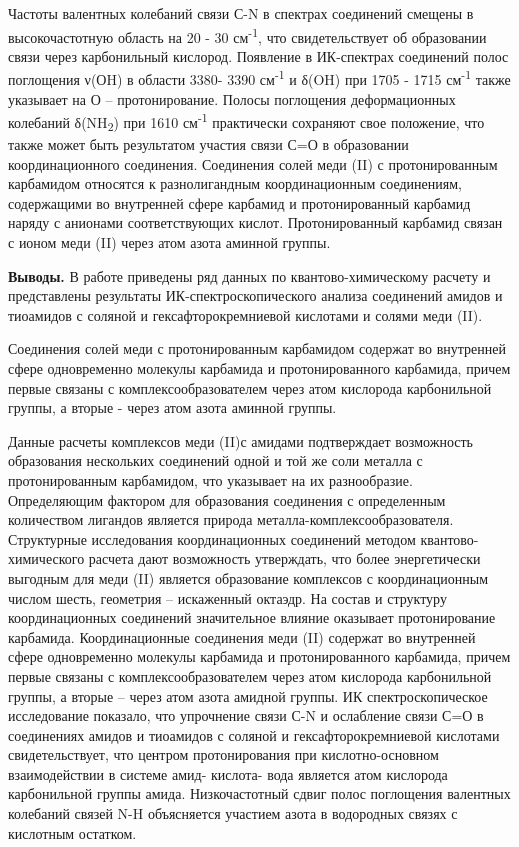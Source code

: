 Частоты валентных колебаний связи С-N в спектрах соединений смещены в
высокочастотную область на 20 - 30 см\textsuperscript{-1}, что
свидетельствует об образовании связи через карбонильный кислород.
Появление в ИК-спектрах соединений полос поглощения ν(ОH) в области
3380- 3390 см\textsuperscript{-1} и δ(OH) при 1705 - 1715
см\textsuperscript{-1} также указывает на О -- протонирование. Полосы
поглощения деформационных колебаний δ(NH\textsubscript{2}) при 1610
см\textsuperscript{-1} практически сохраняют свое положение, что также
может быть результатом участия связи С=О в образовании координационного
соединения. Соединения солей меди (II) с протонированным карбамидом
относятся к разнолигандным координационным соединениям, содержащими во
внутренней сфере карбамид и протонированный карбамид наряду с анионами
соответствующих кислот. Протонированный карбамид связан с ионом меди
(II) через атом азота аминной группы.

{\bfseries Выводы.} В работе приведены ряд данных по квантово-химическому
расчету и представлены результаты ИК-спектроскопического анализа
соединений амидов и тиоамидов с соляной и гексафторокремниевой кислотами
и солями меди (II).

Соединения солей меди с протонированным карбамидом содержат во
внутренней сфере одновременно молекулы карбамида и протонированного
карбамида, причем первые связаны с комплексообразователем через атом
кислорода карбонильной группы, а вторые - через атом азота аминной
группы.

Данные расчеты комплексов меди (II)с амидами подтверждает возможность
образования нескольких соединений одной и той же соли металла с
протонированным карбамидом, что указывает на их разнообразие.
Определяющим фактором для образования соединения с определенным
количеством лигандов является природа металла-комплексообразователя.
Структурные исследования координационных соединений методом
квантово-химического расчета дают возможность утверждать, что более
энергетически выгодным для меди (II) является образование комплексов с
координационным числом шесть, геометрия -- искаженный октаэдр. На состав
и структуру координационных соединений значительное влияние оказывает
протонирование карбамида. Координационные соединения меди (II) содержат
во внутренней сфере одновременно молекулы карбамида и протонированного
карбамида, причем первые связаны с комплексообразователем через атом
кислорода карбонильной группы, а вторые -- через атом азота амидной
группы. ИК спектроскопическое исследование показало, что упрочнение
связи С-N и ослабление связи С=О в соединениях амидов и тиоамидов с
соляной и гексафторокремниевой кислотами свидетельствует, что центром
протонирования при кислотно-основном взаимодействии в системе амид-
кислота- вода является атом кислорода карбонильной группы амида.
Низкочастотный сдвиг полос поглощения валентных колебаний связей N-H
объясняется участием азота в водородных связях с кислотным остатком.

